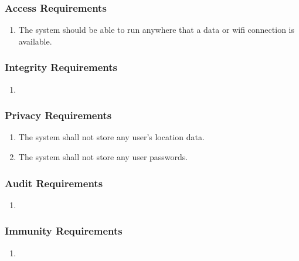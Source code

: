 \documentclass[titlepage]{article}
\begin{document}
		\subsubsection{Access Requirements}
		\label{ssub:access_requirements}
		\begin{enumerate}[{SR}1. ]
			\item
			The system should be able to run anywhere that a data or wifi connection is available.
		\end{enumerate}
		
		\subsubsection{Integrity Requirements}
		\label{ssub:integrity_requirements}
		\begin{enumerate}[{SR}1. ]
			\item 
		\end{enumerate}
		
		\subsubsection{Privacy Requirements}
		\label{ssub:privacy_requirements}
		\begin{enumerate}[{SR}1. ]
			\item 
			The system shall not store any user's location data.
			\item
			The system shall not store any user passwords.
		\end{enumerate}
		
		\subsubsection{Audit Requirements}
		\label{ssub:audit_requirements}
		\begin{enumerate}[{SR}1. ]
			\item 
		\end{enumerate}
		
		\subsubsection{Immunity Requirements}
		\label{ssub:immunity_requirements}
		\begin{enumerate}[{SR}1. ]
			\item 
		\end{enumerate}
		
\end{document}
